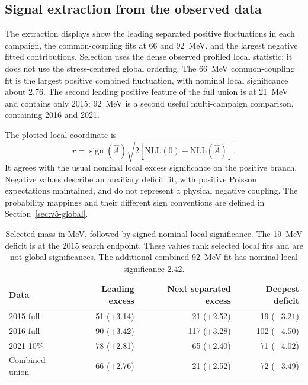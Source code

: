 \FloatBarrier\clearpage
\subsection{Signal extraction from the observed data}
\label{sec:extractions}\label{sec:v5-extractions}

The extraction displays show the leading separated positive fluctuations in
each campaign, the common-coupling fits at 66 and 92~MeV, and the largest
negative fitted contributions. Selection uses the dense observed profiled
local statistic; it does not use the stress-centered global ordering. The
66~MeV common-coupling fit is the largest positive combined fluctuation,
with nominal local significance about 2.76. The second leading positive
feature of the full union is at 21~MeV and contains only 2015; 92~MeV is a
second useful multi-campaign comparison, containing 2016 and 2021.

The plotted local coordinate is
\begin{equation}
 r=\operatorname{sign}(\widehat A)
 \sqrt{2[\mathrm{NLL}(0)-\mathrm{NLL}(\widehat A)]}.
\end{equation}
It agrees with the usual nominal local excess significance on the positive
branch. Negative values describe an auxiliary deficit fit, with positive
Poisson expectations maintained, and do not represent a physical negative
coupling. The probability mappings and their different sign conventions
are defined in Section~\ref{sec:v5-global}.

\begin{table}[htbp]\centering\small
\begin{tabular}{lrrr}\toprule
Data & Leading excess & Next separated excess & Deepest deficit\\\midrule
2015 full & 51 (+3.14) & 21 (+2.52) & 19 ($-3.21$)\\
2016 full & 90 (+3.42) & 117 (+3.28) & 102 ($-4.50$)\\
2021 10\% & 78 (+2.81) & 65 (+2.40) & 71 ($-4.02$)\\
Combined union & 66 (+2.76) & 21 (+2.52) & 72 ($-3.49$)\\\bottomrule
\end{tabular}
\caption{Selected mass in MeV, followed by signed nominal local significance.
The 19~MeV deficit is at the 2015 search endpoint. These values rank selected
local fits and are not global significances. The additional combined
92~MeV fit has nominal local significance 2.42.}
\end{table}

